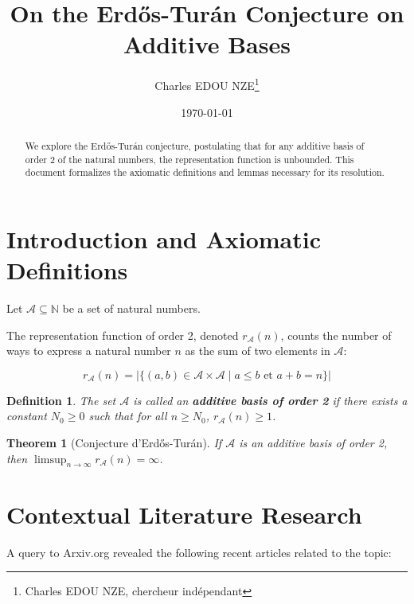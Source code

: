 \documentclass[11pt,a4paper]{article}
\title{On the Erd\H{o}s-Tur\'an Conjecture on Additive Bases}
\author{Charles EDOU NZE\thanks{Charles EDOU NZE, chercheur ind\'ependant}}
\date{\today}
\newtheorem{theorem}{Theorem}
\newtheorem{definition}{Definition}
\begin{document}
\maketitle

\begin{abstract}
We explore the Erd\H{o}s-Tur\'an conjecture, postulating that for any additive basis of order 2 of the natural numbers, the representation function is unbounded. This document formalizes the axiomatic definitions and lemmas necessary for its resolution.
\end{abstract}

\section{Introduction and Axiomatic Definitions}
Let $\mathcal{A} \subseteq \mathbb{N}$ be a set of natural numbers.

The representation function of order 2, denoted $r_{\mathcal{A}}(n)$, counts the number of ways to express a natural number $n$ as the sum of two elements in $\mathcal{A}$:

\begin{equation*}
r_{\mathcal{A}}(n) = |\{ (a, b) \in \mathcal{A} \times \mathcal{A} \mid a \le b \text{ et } a + b = n \}|
\end{equation*}

\begin{definition}
The set $\mathcal{A}$ is called an \textbf{additive basis of order 2} if there exists a constant $N_0 \ge 0$ such that for all $n \ge N_0$, $r_{\mathcal{A}}(n) \ge 1$.
\end{definition}

\begin{theorem}[Conjecture d'Erd\H{o}s-Tur\'an]
If $\mathcal{A}$ is an additive basis of order 2, then $\limsup_{n \to \infty} r_{\mathcal{A}}(n) = \infty$.
\end{theorem}

\section{Contextual Literature Research}
A query to Arxiv.org revealed the following recent articles related to the topic:
\end{document}
